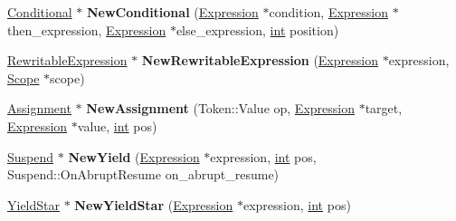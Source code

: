 \begin{DoxyCompactItemize}
\item 
\mbox{\label{classv8_1_1internal_1_1AstNodeFactory_aa6271ed2037e588add836e842383323f}} 
\mbox{\hyperlink{classv8_1_1internal_1_1Conditional}{Conditional}} $\ast$ {\bfseries New\+Conditional} (\mbox{\hyperlink{classv8_1_1internal_1_1Expression}{Expression}} $\ast$condition, \mbox{\hyperlink{classv8_1_1internal_1_1Expression}{Expression}} $\ast$then\+\_\+expression, \mbox{\hyperlink{classv8_1_1internal_1_1Expression}{Expression}} $\ast$else\+\_\+expression, \mbox{\hyperlink{classint}{int}} position)
\item 
\mbox{\label{classv8_1_1internal_1_1AstNodeFactory_ae08c852a9975fb3705fa975183741558}} 
\mbox{\hyperlink{classv8_1_1internal_1_1RewritableExpression}{Rewritable\+Expression}} $\ast$ {\bfseries New\+Rewritable\+Expression} (\mbox{\hyperlink{classv8_1_1internal_1_1Expression}{Expression}} $\ast$expression, \mbox{\hyperlink{classv8_1_1internal_1_1Scope}{Scope}} $\ast$scope)
\item 
\mbox{\label{classv8_1_1internal_1_1AstNodeFactory_a0cdc5091e274fe4ad283258d882eee57}} 
\mbox{\hyperlink{classv8_1_1internal_1_1Assignment}{Assignment}} $\ast$ {\bfseries New\+Assignment} (Token\+::\+Value op, \mbox{\hyperlink{classv8_1_1internal_1_1Expression}{Expression}} $\ast$target, \mbox{\hyperlink{classv8_1_1internal_1_1Expression}{Expression}} $\ast$value, \mbox{\hyperlink{classint}{int}} pos)
\item 
\mbox{\label{classv8_1_1internal_1_1AstNodeFactory_ae41dbb67cf0ff40100ea812a6d327e64}} 
\mbox{\hyperlink{classv8_1_1internal_1_1Suspend}{Suspend}} $\ast$ {\bfseries New\+Yield} (\mbox{\hyperlink{classv8_1_1internal_1_1Expression}{Expression}} $\ast$expression, \mbox{\hyperlink{classint}{int}} pos, Suspend\+::\+On\+Abrupt\+Resume on\+\_\+abrupt\+\_\+resume)
\item 
\mbox{\label{classv8_1_1internal_1_1AstNodeFactory_a10a76523bd5732b4b143fc58220b5034}} 
\mbox{\hyperlink{classv8_1_1internal_1_1YieldStar}{Yield\+Star}} $\ast$ {\bfseries New\+Yield\+Star} (\mbox{\hyperlink{classv8_1_1internal_1_1Expression}{Expression}} $\ast$expression, \mbox{\hyperlink{classint}{int}} pos)

\end{DoxyCompactItemize}
